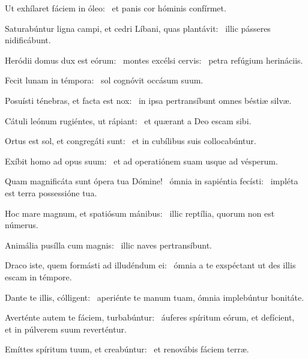 \item Ut exhílaret fáciem in óleo:~\psstar{} et panis cor hóminis confírmet.

\item Saturabúntur ligna campi, et cedri Líbani, quas plantávit:~\psstar{} illic pásseres nidificábunt.

\item Heródii domus dux est eórum:~\pscross{} montes excélsi cervis:~\psstar{} petra refúgium herináciis.

\item Fecit lunam in témpora:~\psstar{} sol cognóvit occásum suum.

\item Posuísti ténebras, et facta est nox:~\psstar{} in ipsa pertransíbunt omnes béstiæ silvæ.

\item Cátuli leónum rugiéntes, ut rápiant:~\psstar{} et quærant a Deo escam sibi.

\item Ortus est sol, et congregáti sunt:~\psstar{} et in cubílibus suis collocabúntur.

\item Exíbit homo ad opus suum:~\psstar{} et ad operatiónem suam usque ad vésperum.

\item Quam magnificáta sunt ópera tua Dómine!~\pscross{} ómnia in sapiéntia fecísti:~\psstar{} impléta est terra possessióne tua.

\item Hoc mare magnum, et spatiósum mánibus:~\psstar{} illic reptília, quorum non est númerus.

\item Animália pusílla cum magnis:~\psstar{} illic naves pertransíbunt.

\item Draco iste, quem formásti ad illudéndum ei:~\psstar{} ómnia a te exspéctant ut des illis escam in témpore.

\item Dante te illis, cólligent:~\psstar{} aperiénte te manum tuam, ómnia implebúntur bonitáte.

\item Averténte autem te fáciem, turbabúntur:~\pscross{} áuferes spíritum eórum, et defícient,~\psstar{} et in púlverem suum reverténtur.

\item Emíttes spíritum tuum, et creabúntur:~\psstar{} et renovábis fáciem terræ.

